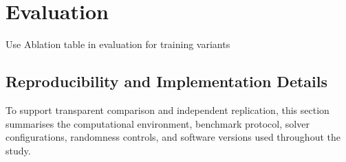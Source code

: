 \chapter{Evaluation}
\label{chp:evaluation}
% 
{\color{red} Use Ablation table in evaluation for training variants}

\section{Reproducibility and Implementation Details}

To support transparent comparison and independent replication, this section
summarises the computational environment, benchmark protocol, solver
configurations, randomness controls, and software versions used throughout the
study.

